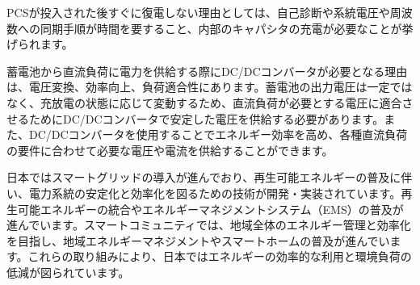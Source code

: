 \documentclass[a4paper,11pt,xelatex,ja=standard]{bxjsarticle}
\begin{document}
                PCSが投入された後すぐに復電しない理由としては、自己診断や系統電圧や周波数への同期手順が時間を要すること、内部のキャパシタの充電が必要なことが挙げられます。

                蓄電池から直流負荷に電力を供給する際にDC/DCコンバータが必要となる理由は、電圧変換、効率向上、負荷適合性にあります。蓄電池の出力電圧は一定ではなく、充放電の状態に応じて変動するため、直流負荷が必要とする電圧に適合させるためにDC/DCコンバータで安定した電圧を供給する必要があります。また、DC/DCコンバータを使用することでエネルギー効率を高め、各種直流負荷の要件に合わせて必要な電圧や電流を供給することができます。

                日本ではスマートグリッドの導入が進んでおり、再生可能エネルギーの普及に伴い、電力系統の安定化と効率化を図るための技術が開発・実装されています。再生可能エネルギーの統合やエネルギーマネジメントシステム（EMS）の普及が進んでいます。スマートコミュニティでは、地域全体のエネルギー管理と効率化を目指し、地域エネルギーマネジメントやスマートホームの普及が進んでいます。これらの取り組みにより、日本ではエネルギーの効率的な利用と環境負荷の低減が図られています。
\end{document}
